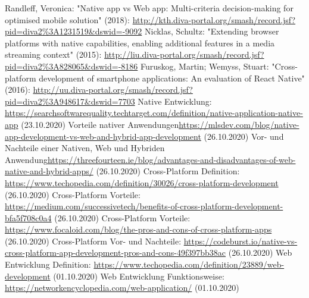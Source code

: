 \documentclass[ngerman]{article}
\begin{document}
    \begin{thebibliography}{9}
        Randleff, Veronica: "Native app vs Web app: Multi-criteria decision-making for optimised mobile solution" (2018): \url{http://kth.diva-portal.org/smash/record.jsf?pid=diva2%3A1231519&dswid=-9092}
        Nicklas, Schultz: "Extending browser platforms with native capabilities, enabling additional features in a media streaming context" (2015): \url{http://liu.diva-portal.org/smash/record.jsf?pid=diva2%3A828065&dswid=-8186}
        Furuskog, Martin; Wemyss, Stuart: "Cross-platform development of smartphone applications: An evaluation of React Native" (2016): \url{http://uu.diva-portal.org/smash/record.jsf?pid=diva2%3A948617&dswid=7703}
        Native Entwicklung: \url{https://searchsoftwarequality.techtarget.com/definition/native-application-native-app} (23.10.2020)
        Vorteile nativer Anwendungen\url{https://mlsdev.com/blog/native-app-development-vs-web-and-hybrid-app-development} (26.10.2020)
        Vor- und Nachteile einer Nativen, Web und Hybriden Anwendung\url{https://threefourteen.ie/blog/advantages-and-disadvantages-of-web-native-and-hybrid-apps/} (26.10.2020)
        Cross-Platform Definition: \url{https://www.techopedia.com/definition/30026/cross-platform-development} (26.10.2020)
        Cross-Platform Vorteile: \url{https://medium.com/successivetech/benefits-of-cross-platform-development-bfa5f708c0a4} (26.10.2020)
        Cross-Platform Vorteile: \url{https://www.focaloid.com/blog/the-pros-and-cons-of-cross-platform-apps} (26.10.2020)
        Cross-Platform Vor- und Nachteile: \url{https://codeburst.io/native-vs-cross-platform-app-development-pros-and-cons-49f397bb38ac} (26.10.2020)
        Web Entwicklung Definition: \url{https://www.techopedia.com/definition/23889/web-development} (01.10.2020)
        Web Entwicklung Funktionsweise: \url{https://networkencyclopedia.com/web-application/} (01.10.2020)

\end{thebibliography}
\end{document}
